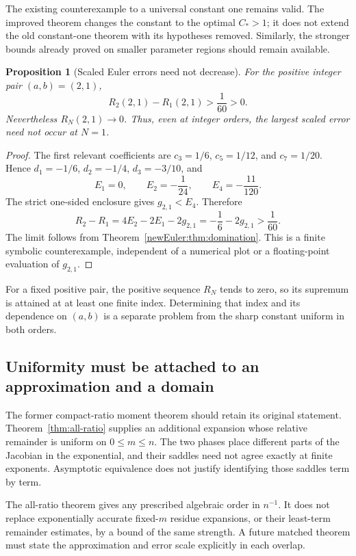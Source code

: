 \documentclass[11pt,letterpaper]{article}
\newtheorem{proposition}[theorem]{Proposition}
\theoremstyle{definition}
\theoremstyle{remark}
\begin{document}
The existing counterexample to a universal constant one remains valid.
The improved theorem changes the constant to the optimal $C_*>1$;
it does not extend the old constant-one theorem with its hypotheses
removed. Similarly, the stronger bounds already proved on smaller
parameter regions should remain available.

\begin{proposition}[Scaled Euler errors need not decrease]
\label{prop:scaled-error-counterexample}
For the positive integer pair $(a,b)=(2,1)$,
\[
 R_2(2,1)-R_1(2,1)>\frac1{60}>0.
\]
Nevertheless $R_N(2,1)\to0$. Thus, even at integer orders, the largest
scaled error need not occur at $N=1$.
\end{proposition}
\begin{proof}
The first relevant coefficients are
$c_3=1/6$, $c_5=1/12$, and $c_7=1/20$. Hence
$d_1=-1/6$, $d_2=-1/4$, $d_3=-3/10$, and
\[
 E_1=0,\qquad E_2=-\frac1{24},\qquad E_4=-\frac{11}{120}.
\]
The strict one-sided enclosure gives $g_{2,1}<E_4$. Therefore
\[
 R_2-R_1=4E_2-2E_1-2g_{2,1}
       =-\frac16-2g_{2,1}>\frac1{60}.
\]
The limit follows from Theorem~\ref{newEuler:thm:domination}.
This is a finite symbolic counterexample, independent of a numerical
plot or a floating-point evaluation of $g_{2,1}$.
\end{proof}

For a fixed positive pair, the positive sequence $R_N$ tends to zero,
so its supremum is attained at at least one finite index. Determining
that index and its dependence on $(a,b)$ is a separate problem from
the sharp constant uniform in both orders.

\subsection{Uniformity must be attached to an approximation and a domain}

The former compact-ratio moment theorem should retain its original
statement. Theorem~\ref{thm:all-ratio} supplies an additional expansion
whose relative remainder is uniform on $0\le m\le n$. The two phases
place different parts of the Jacobian in the exponential, and their
saddles need not agree exactly at finite exponents. Asymptotic
equivalence does not justify identifying those saddles term by term.

The all-ratio theorem gives any prescribed algebraic order in $n^{-1}$.
It does not replace exponentially accurate fixed-$m$ residue expansions,
or their least-term remainder estimates, by a bound of the same strength.
A future matched theorem must state the approximation and error scale
explicitly in each overlap.
\end{document}
